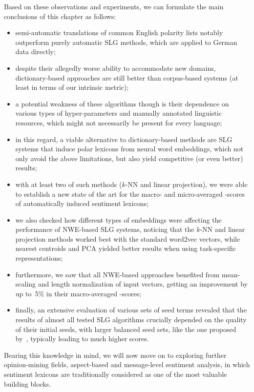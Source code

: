 Based on these observations and experiments, we can formulate the main
conclusions of this chapter as follows:
\begin{itemize}
\item semi-automatic translations of common English polarity lists
  notably outperform purely automatic SLG methods, which are applied
  to German data directly;
\item despite their allegedly worse ability to accommodate new
  domains, dictionary-based approaches are still better than
  corpus-based systems (at least in terms of our intrinsic metric);
\item a potential weakness of these algorithms though is their
  dependence on various types of hyper-parameters and manually
  annotated linguistic resources, which might not necessarily be
  present for every language;
\item in this regard, a viable alternative to dictionary-based methods
  are SLG systems that induce polar lexicons from neural word
  embeddings, which not only avoid the above limitations, but also
  yield competitive (or even better) results;
\item with at least two of such methods ($k$-NN and linear
  projection), we were able to establish a new state of the art for
  the macro- and micro-averaged \F-scores of automatically induced
  sentiment lexicons;
\item we also checked how different types of embeddings were affecting
  the performance of NWE-based SLG systems, noticing that the $k$-NN
  and linear projection methods worked best with the standard word2vec
  vectors, while nearest centroids and PCA yielded better results when
  using task-specific representations;
\item furthermore, we saw that all NWE-based approaches benefited from
  mean-scaling and length normalization of input vectors, getting an
  improvement by up to~5\% in their macro-averaged \F-scores;
\item finally, an extensive evaluation of various sets of seed terms
  revealed that the results of almost all tested SLG algorithms
  crucially depended on the quality of their initial seeds, with
  larger balanced seed sets, \eg{} like the one proposed
  by~\citet{Kim:04}, typically leading to much higher scores.
\end{itemize}

Bearing this knowledge in mind, we will now move on to exploring
further opinion-mining fields, aspect-based and message-level
sentiment analysis, in which sentiment lexicons are traditionally
considered as one of the most valuable building blocks.
